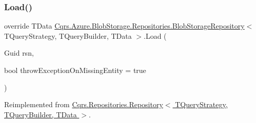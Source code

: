 \subsubsection{\texorpdfstring{Load()}{Load()}}
{\footnotesize\ttfamily override T\+Data \hyperlink{classCqrs_1_1Azure_1_1BlobStorage_1_1Repositories_1_1BlobStorageRepository}{Cqrs.\+Azure.\+Blob\+Storage.\+Repositories.\+Blob\+Storage\+Repository}$<$ T\+Query\+Strategy, T\+Query\+Builder, T\+Data $>$.Load (\begin{DoxyParamCaption}\item[{Guid}]{rsn,  }\item[{bool}]{throw\+Exception\+On\+Missing\+Entity = {\ttfamily true} }\end{DoxyParamCaption})\hspace{0.3cm}{\ttfamily [virtual]}}



Reimplemented from \hyperlink{classCqrs_1_1Repositories_1_1Repository_a444e9dfe4710be90940dbb6dec9d856f_a444e9dfe4710be90940dbb6dec9d856f}{Cqrs.\+Repositories.\+Repository$<$ T\+Query\+Strategy, T\+Query\+Builder, T\+Data $>$}.

